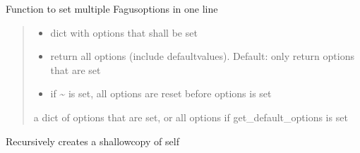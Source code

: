 \documentclass[a4paper,10pt,english]{sphinxmanual}
\begin{document}
\begin{fulllineitems}
\begin{fulllineitems}
\label{\detokenize{fagus.fagus:fagus.fagus.Fagus.options}}
\pysigstartsignatures
{}
\pysigstopsignatures
\sphinxAtStartPar
Function to set multiple Fagus\sphinxhyphen{}options in one line
\begin{quote}\begin{description}
\begin{itemize}
\item {}
\sphinxAtStartPar
{} \textendash{} dict with options that shall be set

\item {}
\sphinxAtStartPar
{} \textendash{} return all options (include default\sphinxhyphen{}values). Default: only return options that are set

\item {}
\sphinxAtStartPar
{} \textendash{} if \textasciitilde{} is set, all options are reset before options is set

\end{itemize}

\sphinxAtStartPar
a dict of options that are set, or all options if get\_default\_options is set

\end{description}\end{quote}

\end{fulllineitems}


\begin{fulllineitems}
\label{\detokenize{fagus.fagus:fagus.fagus.Fagus.__copy__}}
\pysigstartsignatures
{}
\pysigstopsignatures
\sphinxAtStartPar
Recursively creates a shallow\sphinxhyphen{}copy of self


\end{fulllineitems}
\end{fulllineitems}
\end{document}
